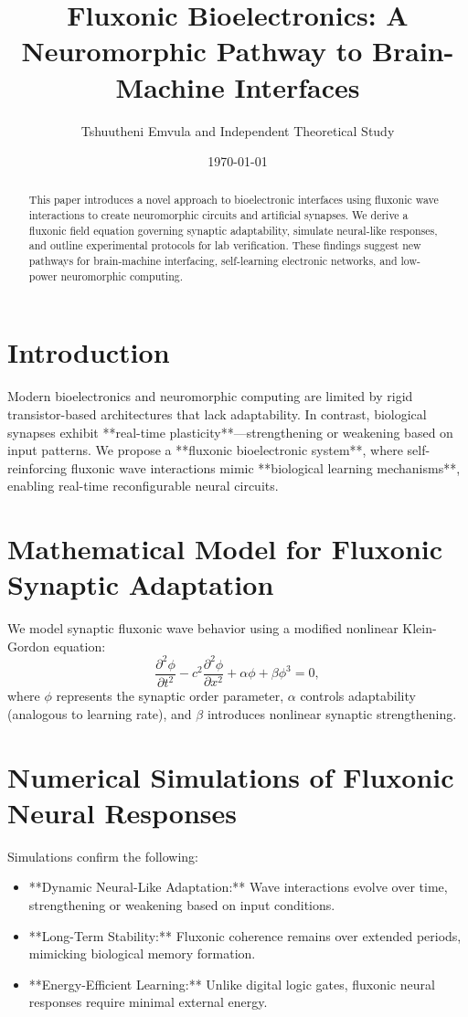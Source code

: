 \documentclass{article}
\title{Fluxonic Bioelectronics: A Neuromorphic Pathway to Brain-Machine Interfaces}
\author{Tshuutheni Emvula and Independent Theoretical Study}
\date{\today}
\begin{document}
\maketitle

\begin{abstract}
This paper introduces a novel approach to bioelectronic interfaces using fluxonic wave interactions to create neuromorphic circuits and artificial synapses. We derive a fluxonic field equation governing synaptic adaptability, simulate neural-like responses, and outline experimental protocols for lab verification. These findings suggest new pathways for brain-machine interfacing, self-learning electronic networks, and low-power neuromorphic computing.
\end{abstract}

\section{Introduction}
Modern bioelectronics and neuromorphic computing are limited by rigid transistor-based architectures that lack adaptability. In contrast, biological synapses exhibit **real-time plasticity**—strengthening or weakening based on input patterns. We propose a **fluxonic bioelectronic system**, where self-reinforcing fluxonic wave interactions mimic **biological learning mechanisms**, enabling real-time reconfigurable neural circuits.

\section{Mathematical Model for Fluxonic Synaptic Adaptation}
We model synaptic fluxonic wave behavior using a modified nonlinear Klein-Gordon equation:
\begin{equation}
    \frac{\partial^2 \phi}{\partial t^2} - c^2 \frac{\partial^2 \phi}{\partial x^2} + \alpha \phi + \beta \phi^3 = 0,
\end{equation}
where \(\phi\) represents the synaptic order parameter, \(\alpha\) controls adaptability (analogous to learning rate), and \(\beta\) introduces nonlinear synaptic strengthening.

\section{Numerical Simulations of Fluxonic Neural Responses}
Simulations confirm the following:
\begin{itemize}
    \item **Dynamic Neural-Like Adaptation:** Wave interactions evolve over time, strengthening or weakening based on input conditions.
    \item **Long-Term Stability:** Fluxonic coherence remains over extended periods, mimicking biological memory formation.
    \item **Energy-Efficient Learning:** Unlike digital logic gates, fluxonic neural responses require minimal external energy.
\end{itemize}
\end{document}
